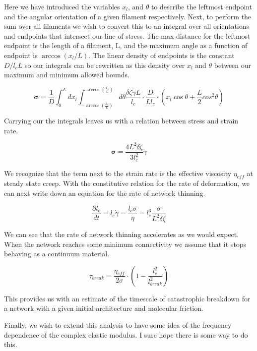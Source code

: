 \documentclass[prb,11pt]{revtex4-1}
\begin{document}
Here we have introduced the variables $x_l$, and $\theta$ to describe the leftmost endpoint and the angular orientation of a given filament respectively.  Next, to perform the sum over all filaments we wish to convert this to an integral over all orientations and endpoints that intersect our line of stress. The max distance for the leftmost endpoint is the length of a filament, L, and the maximum angle as a function of endpoint is $\arccos(x_l/L)$.  The linear density of endpoints is the constant $D/l_cL$ so our integrals can be rewritten as this density over $x_l$ and $\theta$ between our maximum and minimum allowed bounds.

\begin{equation}
\mathbf{\sigma} =  \frac{1}{D} \int_0^L dx_l \int_{-\arccos (\frac{x_l}{L})}^{\arccos (\frac{x_l}{L})}d\theta \frac{\delta \zeta \dot \gamma L}{l_c} \cdot \frac{D}{Ll_c}\cdot (x_l \cos \theta + \frac{L}{2} cos^2\theta)
\end{equation}

Carrying our the integrals leaves us with a relation between stress and strain rate.

\begin{equation}
\mathbf{\sigma} = \frac{4L^2\delta \zeta}{3l_c^2} \dot \gamma \end{equation}

We recognize that the term next to the strain rate is the effective viscosity $\eta_{eff}$ at steady state creep.  With the constitutive relation for the rate of deformation, we can next write down an equation for the rate of network thinning.  

\begin{equation}
\frac{\partial l_c}{dt}=l_c\dot \gamma =\frac{l_c \sigma}{\eta}=l_c^3\frac{ \sigma}{L^2 \delta \zeta}
\end{equation}

We can see that the rate of network thinning accelerates as we would expect.  When the network reaches some minimum connectivity we assume that it stops behaving as a continuum material.  

\begin{equation}
\tau_{break} = \frac{\eta_{eff}}{2\sigma}\cdot\left ( 1 -\frac{l_c^2}{l_{break}^2} \right )
\end{equation}

This provides us with an estimate of the timescale of catastrophic breakdown for a network with a given initial architecture and molecular friction.

Finally, we wish to extend this analysis to have some idea of the frequency dependence of the complex elastic modulus.  I sure hope there is some way to do this.
\end{document}
